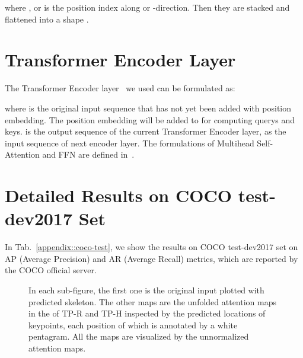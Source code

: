 \documentclass{article}
\begin{document}
where ,  or  is the position index along  or -direction. Then they are stacked and flattened into a shape .


\section{Transformer Encoder Layer}
The Transformer Encoder layer~\cite{vaswani2017attention} we used can be formulated as:

where  is the original input sequence that has not yet been added with position embedding. The position embedding will be added to  for computing querys and keys.   is the output sequence of the current Transformer Encoder layer, as the input sequence of next encoder layer.	 The formulations of Multihead Self-Attention and FFN are defined in~\cite{vaswani2017attention}.

\section{Detailed Results on COCO test-dev2017 Set}
In Tab.~\ref{appendix::coco-test}, we show the results on COCO test-dev2017 set on AP (Average Precision) and AR (Average Recall) metrics, which are reported by the COCO official server.


\begin{figure*}[h]
\centering
{}
\quad
{}
\quad
{}
\quad
{}


\quad
{}



\caption{In each sub-figure, the first one is the original input plotted with predicted skeleton. The other maps are the unfolded attention maps in the  of TP-R and TP-H inspected by the predicted locations of keypoints, each position of which is annotated by a white pentagram. All the maps are visualized by the unnormalized attention maps.}
\label{final_attention}
\end{figure*}
\end{document}
